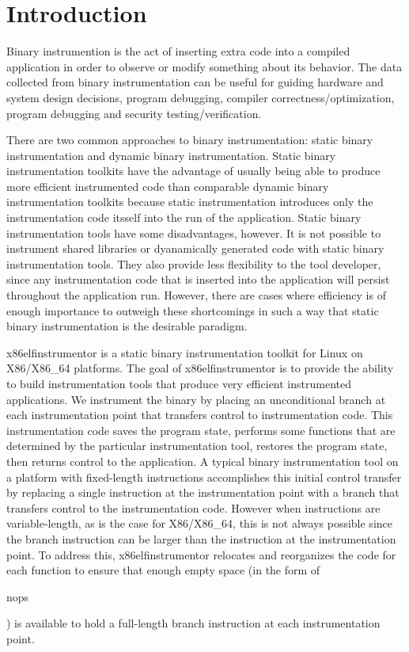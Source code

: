 \section{Introduction}
Binary instrumention is the act of inserting extra code into a compiled
application in order to observe or modify something about its behavior. The data
collected from binary instrumentation can be useful for guiding hardware and
system design decisions, program debugging, compiler correctness/optimization,
program debugging and security testing/verification.

There are two common approaches to binary instrumentation: static binary
instrumentation and dynamic binary instrumentation. Static binary
instrumentation toolkits have the advantage of usually being able to produce
more efficient instrumented code than comparable dynamic binary instrumentation toolkits
because static instrumentation introduces only the instrumentation code itsself into the run of the
application. Static binary instrumentation tools have some disadvantages,
however. It is not possible to instrument shared libraries or dyanamically
generated code with static binary instrumentation tools. They also provide less
flexibility to the tool developer, since any instrumentation code that is
inserted into the application will persist throughout the application run.
However, there are cases where efficiency is of enough importance to outweigh
these shortcomings in such a way that static binary instrumentation is the
desirable paradigm.

x86elfinstrumentor is a static binary instrumentation toolkit for Linux on
X86/X86\_64 platforms. The goal of x86elfinstrumentor is to provide the ability
to build instrumentation tools that produce very efficient instrumented
applications. We instrument the binary by placing an unconditional branch at each instrumentation
point that transfers control to instrumentation code. This instrumentation code saves the
program state, performs some functions that are determined by the particular instrumentation tool,
restores the program state, then returns control to the application.
A typical binary instrumentation tool on a platform with fixed-length instructions 
\cite{tikir2006pmac} accomplishes this initial control transfer by replacing a
single instruction at the instrumentation point with a branch that transfers
control to the instrumentation code. However when instructions are variable-length, as
is the case for X86/X86\_64, this is not always possible since the branch instruction can be larger than the
instruction at the instrumentation point. To address this, x86elfinstrumentor
relocates and reorganizes the code for each function to ensure that enough empty
space (in the form of \begin{it}nops\end{it}) is available to hold a full-length branch instruction at each
instrumentation point.

